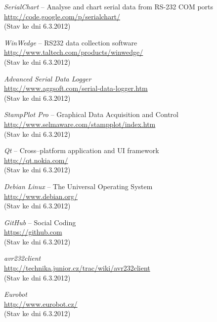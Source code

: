 \documentclass[12pt, a4paper, oneside]{article}
\newcommand{\It}{\textit}  %
\begin{document}
\newpage
 \begin{thebibliography}{99}

     \It{SerialChart} -- Analyse and chart serial data from RS-232 COM ports \\
    \url{http://code.google.com/p/serialchart/}\\
    (Stav ke dni 6.3.2012)

     \It{WinWedge} -- RS232 data collection software \\
    \url{http://www.taltech.com/products/winwedge/}\\
    (Stav ke dni 6.3.2012)

     \It{Advanced Serial Data Logger} \\
    \url{http://www.aggsoft.com/serial-data-logger.htm}\\
    (Stav ke dni 6.3.2012)

     \It{StampPlot Pro} -- Graphical Data Acquisition and Control \\
    \url{http://www.selmaware.com/stampplot/index.htm}\\
    (Stav ke dni 6.3.2012)

     \It{Qt} -- Cross--platform application and UI framework \\
    \url{http://qt.nokia.com/}\\
    (Stav ke dni 6.3.2012)

     \It{Debian Linux} -- The Universal Operating System \\
    \url{http://www.debian.org/}\\
    (Stav ke dni 6.3.2012)

     \It{GitHub} -- Social Coding \\
    \url{https://github.com}\\
    (Stav ke dni 6.3.2012)

     \It{avr232client} \\
    \url{http://technika.junior.cz/trac/wiki/avr232client}\\
    (Stav ke dni 6.3.2012)

     \It{Eurobot} \\
    \url{http://www.eurobot.cz/}\\
    (Stav ke dni 6.3.2012)


\end{thebibliography}
\end{document}
